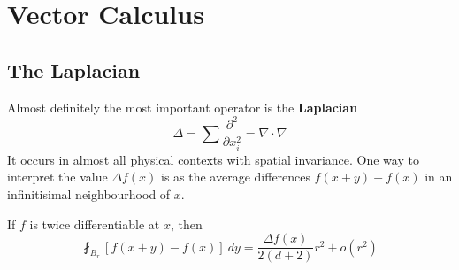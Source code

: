 \chapter{Vector Calculus}

\section{The Laplacian}

Almost definitely the most important operator is the {\bf Laplacian}
%
\[ \Delta = \sum \frac{\partial^2}{\partial x_i^2} = \nabla \cdot \nabla \]
%
It occurs in almost all physical contexts with spatial invariance. One way to interpret the value $\Delta f(x)$ is as the average differences $f(x+y) - f(x)$ in an infinitisimal neighbourhood of $x$.

\begin{theorem}
    If $f$ is twice differentiable at $x$, then
    \[ \fint_{B_r} [f(x+y) - f(x)]\ dy = \frac{\Delta f(x)}{2(d+2)} r^2 + o(r^2) \]
\end{theorem}
